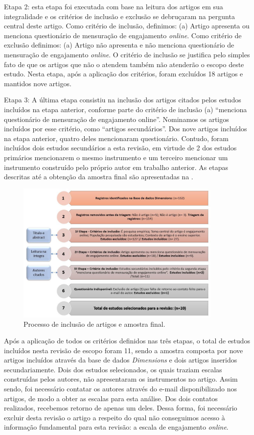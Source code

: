 \documentclass[portuguese]{textolivre}
\begin{document}
Etapa 2: esta etapa foi executada com base na leitura dos artigos em sua integralidade e os critérios de inclusão e exclusão se debruçaram na pergunta central deste artigo. Como critério de inclusão, definimos: (a) Artigo apresenta ou menciona questionário de mensuração de engajamento \textit{online}. Como critério de exclusão definimos: (a) Artigo não apresenta e não menciona questionário de mensuração de engajamento \textit{online}. O critério de inclusão se justifica pelo simples fato de que os artigos que não o atendem também não atenderão o escopo deste estudo. Nesta etapa, após a aplicação dos critérios, foram excluídos 18 artigos e mantidos nove artigos.

Etapa 3: A última etapa consistiu na inclusão dos artigos citados pelos estudos incluídos na etapa anterior, conforme parte do critério de inclusão (a) “menciona questionário de mensuração de engajamento online”. Nominamos os artigos incluídos por esse critério, como “artigos secundários”. Dos nove artigos incluídos na etapa anterior, quatro deles mencionaram questionário. Contudo, foram incluídos dois estudos secundários a esta revisão, em virtude de 2 dos estudos primários mencionarem o mesmo instrumento e um terceiro mencionar um instrumento construído pelo próprio autor em trabalho anterior. As etapas descritas até a obtenção da amostra final são apresentadas na .

\begin{figure}[h!]
 \centering
 \includegraphics[width=0.9\textwidth]{fig2-35747.png}
 \caption{Processo de inclusão de artigos e amostra final.}
 \label{fig2}
\end{figure}

Após a aplicação de todos os critérios definidos nas três etapas, o total de estudos incluídos nesta revisão de escopo foram 11, sendo a amostra composta por nove artigos incluídos através da base de dados \emph{Dimensions} e dois artigos inseridos secundariamente. Dois dos estudos selecionados, os quais traziam escalas construídas pelos autores, não apresentaram os instrumentos no artigo. Assim sendo, foi necessário contatar os autores através do e-mail disponibilizado nos artigos, de modo a obter as escalas para esta análise. Dos dois contatos realizados, recebemos retorno de apenas um deles. Dessa forma, foi necessário excluir desta revisão o artigo a respeito do qual não conseguimos acesso à informação fundamental para esta revisão: a escala de engajamento \textit{online}.
\end{document}
